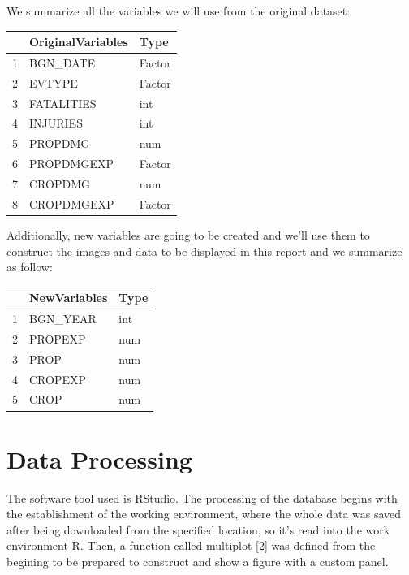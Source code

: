 \documentclass[12pt,spanish, american,b4paper, onecolumn, lmargin=1cm, rmargin=1cm, tmargin=1cm, bmargin=2cm,]{article}
\begin{document}
We summarize all the variables we will use from the original dataset:

\begin{table}[ht]
\centering
\begin{tabular}{rll}
  \toprule
 & OriginalVariables & Type \\ 
  \midrule
1 & BGN\_DATE & Factor \\ 
  2 & EVTYPE & Factor \\ 
  3 & FATALITIES & int \\ 
  4 & INJURIES & int \\ 
  5 & PROPDMG & num \\ 
  6 & PROPDMGEXP & Factor \\ 
  7 & CROPDMG & num \\ 
  8 & CROPDMGEXP & Factor \\ 
   \bottomrule
\end{tabular}
\end{table}

Additionally, new variables are going to be created and we'll use them
to construct the images and data to be displayed in this report and we
summarize as follow:

\begin{table}[ht]
\centering
\begin{tabular}{rll}
  \toprule
 & NewVariables & Type \\ 
  \midrule
1 & BGN\_YEAR & int \\ 
  2 & PROPEXP & num \\ 
  3 & PROP & num \\ 
  4 & CROPEXP & num \\ 
  5 & CROP & num \\ 
   \bottomrule
\end{tabular}
\end{table}

\section{Data Processing \label{datapro}}\label{data-processing}

The software tool used is RStudio. The processing of the database begins
with the establishment of the working environment, where the whole data
was saved after being downloaded from the specified location, so it's
read into the work environment R. Then, a function called multiplot
{[}2{]} was defined from the begining to be prepared to construct and
show a figure with a custom panel.
\end{document}
